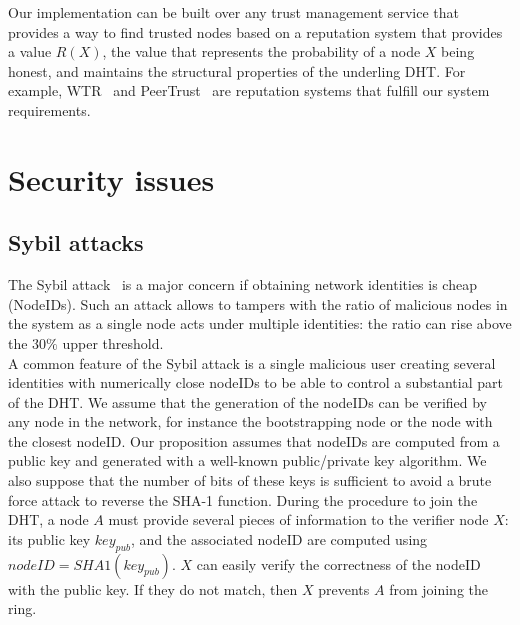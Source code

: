 Our implementation can be built over any trust management service that
provides a way to find trusted nodes based on a reputation system
that provides a value $R(X)$, the value that represents the probability of a node
$X$ being honest, and maintains the structural properties of the underling
DHT. For example, WTR~\cite{bonnaire2009wtr} and
PeerTrust~\cite{xiong2004peertrust} are reputation systems that fulfill our
system requirements.



\section{Security issues}

\subsection{Sybil attacks}
\label{sec:sybil_attacks}

The Sybil attack~\cite{the_sybil_attack} is a major concern if obtaining
network identities is cheap (NodeIDs). Such an attack allows to tampers with the ratio of
malicious nodes in the system as a single node acts under multiple identities:
the ratio can rise above the $30\%$ upper threshold. \\

A common feature of the Sybil attack is a single malicious user creating 
several identities with numerically close nodeIDs to be able to control a
substantial part of the DHT. We assume that the generation of the nodeIDs can
be verified by any node in the network, for instance the bootstrapping node or
the node with the closest nodeID. Our proposition assumes that nodeIDs are
computed from a public key and generated with a well-known public/private key
algorithm. We also suppose that the number of bits of these keys is sufficient
to avoid a brute force attack to reverse the SHA-1 function. During the
procedure to join the DHT, a node $A$ must provide several pieces of information to
the verifier node $X$: its public key $key_{pub}$, and the associated nodeID
are computed using
$nodeID = SHA1(key_{pub})$. $X$ can easily verify the correctness of the nodeID
with the public key. If they do not match, then $X$ prevents $A$ from joining
the ring.\\

